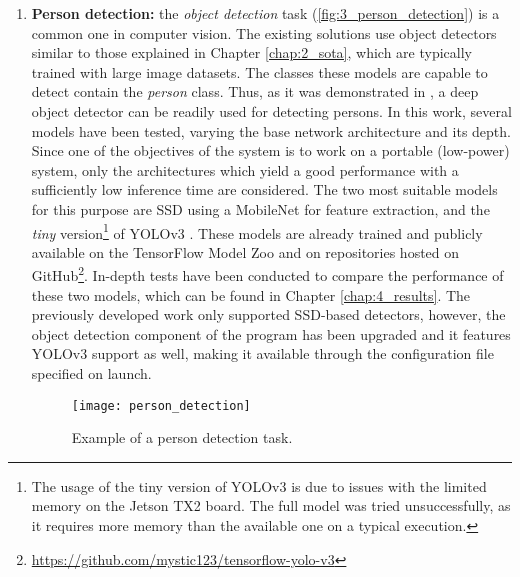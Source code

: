 \begin{enumerate}
	\item \textbf{Person detection:} the \textit{object detection} task (\autoref{fig:3_person_detection}) is a common one in computer vision. The existing solutions use object detectors similar to those explained in Chapter \ref{chap:2_sota}, which are typically trained with large image datasets. The classes these models are capable to detect contain the \textit{person} class. Thus, as it was demonstrated in \cite{tfg}, a deep object detector can be readily used for detecting persons. In this work, several models have been tested, varying the base network architecture and its depth. Since one of the objectives of the system is to work on a portable (low-power) system, only the architectures which yield a good performance with a sufficiently low inference time are considered. The two most suitable models for this purpose are SSD \cite{ssd} using a MobileNet \cite{mobilenet} for feature extraction, and the \textit{tiny} version\footnote{The usage of the tiny version of YOLOv3 is due to issues with the limited memory on the Jetson TX2 board. The full model was tried unsuccessfully, as it requires more memory than the available one on a typical execution.} of YOLOv3 \cite{yolov3}. These models are already trained and publicly available on the TensorFlow Model Zoo \cite{model_zoo} and on repositories hosted on GitHub\footnote{\url{https://github.com/mystic123/tensorflow-yolo-v3}}. In-depth tests have been conducted to compare the performance of these two models, which can be found in Chapter \ref{chap:4_results}. The previously developed work \cite{tfg} only supported SSD-based detectors, however, the object detection component of the program has been upgraded and it features YOLOv3 support as well, making it available through the configuration file specified on launch.
	
\begin{figure}[h]
	\centering
	\texttt{[image: person\_detection]}
	\caption{Example of a person detection task.}
	\label{fig:3_person_detection}
\end{figure}
	

\end{enumerate}
